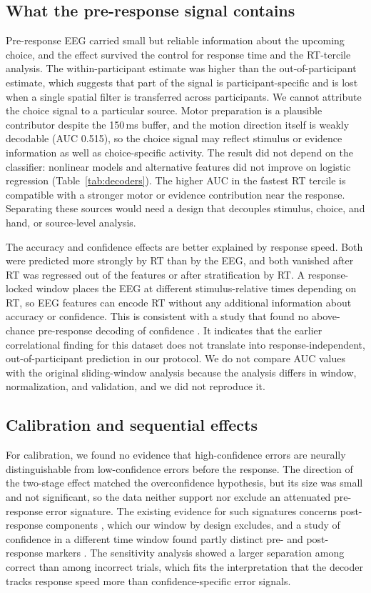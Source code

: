 \documentclass[11pt,a4paper]{article}
\begin{document}
\subsection{What the pre-response signal contains}

Pre-response EEG carried small but reliable information about the upcoming choice, and the effect survived the control for response time and the RT-tercile analysis. The within-participant estimate was higher than the out-of-participant estimate, which suggests that part of the signal is participant-specific and is lost when a single spatial filter is transferred across participants. We cannot attribute the choice signal to a particular source. Motor preparation is a plausible contributor despite the 150\,ms buffer, and the motion direction itself is weakly decodable (AUC 0.515), so the choice signal may reflect stimulus or evidence information as well as choice-specific activity. The result did not depend on the classifier: nonlinear models and alternative features did not improve on logistic regression (Table~\ref{tab:decoders}). The higher AUC in the fastest RT tercile is compatible with a stronger motor or evidence contribution near the response. Separating these sources would need a design that decouples stimulus, choice, and hand, or source-level analysis.

The accuracy and confidence effects are better explained by response speed. Both were predicted more strongly by RT than by the EEG, and both vanished after RT was regressed out of the features or after stratification by RT. A response-locked window places the EEG at different stimulus-relative times depending on RT, so EEG features can encode RT without any additional information about accuracy or confidence. This is consistent with a study that found no above-chance pre-response decoding of confidence \cite{r5}. It indicates that the earlier correlational finding for this dataset \cite{r2} does not translate into response-independent, out-of-participant prediction in our protocol. We do not compare AUC values with the original sliding-window analysis because the analysis differs in window, normalization, and validation, and we did not reproduce it.

\subsection{Calibration and sequential effects}

For calibration, we found no evidence that high-confidence errors are neurally distinguishable from low-confidence errors before the response. The direction of the two-stage effect matched the overconfidence hypothesis, but its size was small and not significant, so the data neither support nor exclude an attenuated pre-response error signature. The existing evidence for such signatures concerns post-response components \cite{r3,r4}, which our window by design excludes, and a study of confidence in a different time window found partly distinct pre- and post-response markers \cite{r18}. The sensitivity analysis showed a larger separation among correct than among incorrect trials, which fits the interpretation that the decoder tracks response speed more than confidence-specific error signals.
\end{document}
